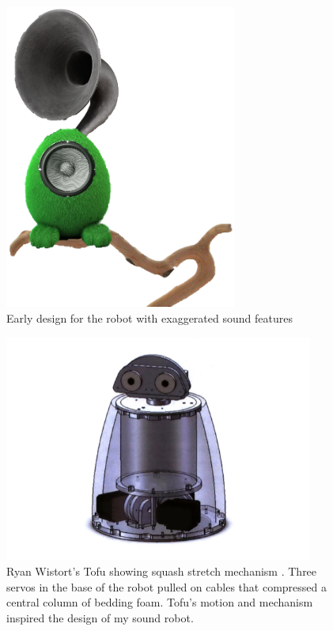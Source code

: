    \begin{figure}[thpb]
      \centering
      \includegraphics[width=3in]{figures/design/green_blob2.png}
      \caption{Early design for the robot with exaggerated sound features}
      \label{fig_green_blob2}
   \end{figure}


   \begin{figure}[thpb]
      \centering
      \includegraphics[width=4in]{figures/design/tofu_design.png}
      \caption{Ryan Wistort's Tofu showing squash stretch mechanism \cite{wistort_tofu_draw}. Three servos in the base of the robot pulled on cables that compressed a central column of bedding foam. Tofu's motion and mechanism inspired the design of my sound robot.}
      \label{fig_tofu_design}
   \end{figure}


